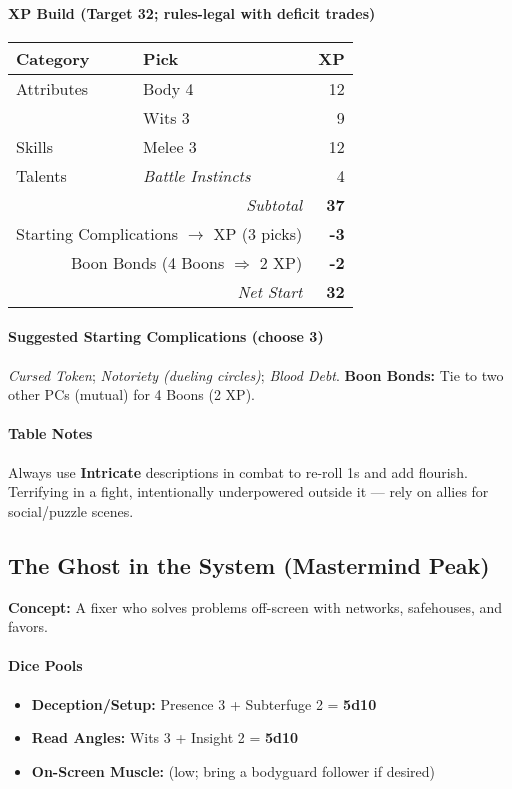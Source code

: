 \documentclass[11pt]{article}
\begin{document}
\paragraph{XP Build (Target 32; rules-legal with deficit trades)}
\begin{tabular}{@{}llr@{}}
\toprule
\textbf{Category} & \textbf{Pick} & \textbf{XP} \\
\midrule
Attributes & Body 4 & 12 \\
           & Wits 3 & 9 \\
Skills     & Melee 3 & 12 \\
Talents    & \emph{Battle Instincts} & 4 \\
\midrule
\multicolumn{2}{r}{\textit{Subtotal}} & \textbf{37} \\
\multicolumn{2}{r}{Starting Complications $\rightarrow$ XP (3 picks)} & \textbf{-3} \\
\multicolumn{2}{r}{Boon Bonds (4 Boons $\Rightarrow$ 2 XP)} & \textbf{-2} \\
\midrule
\multicolumn{2}{r}{\textit{Net Start}} & \textbf{32} \\
\bottomrule
\end{tabular}

\paragraph{Suggested Starting Complications (choose 3)}
\emph{Cursed Token}; \emph{Notoriety (dueling circles)}; \emph{Blood Debt}.  
\textbf{Boon Bonds:} Tie to two other PCs (mutual) for 4 Boons (2 XP).

\paragraph{Table Notes}
Always use \textbf{Intricate} descriptions in combat to re-roll 1s and add flourish. Terrifying in a fight, intentionally underpowered outside it — rely on allies for social/puzzle scenes.

\bigskip

\subsection*{The Ghost in the System (Mastermind Peak)}
\textbf{Concept:} A fixer who solves problems off-screen with networks, safehouses, and favors.

\paragraph{Dice Pools}
\begin{itemize}
  \item \textbf{Deception/Setup:} Presence 3 + Subterfuge 2 = \textbf{5d10}
  \item \textbf{Read Angles:} Wits 3 + Insight 2 = \textbf{5d10}
  \item \textbf{On-Screen Muscle:} (low; bring a bodyguard follower if desired)
\end{itemize}
\end{document}
